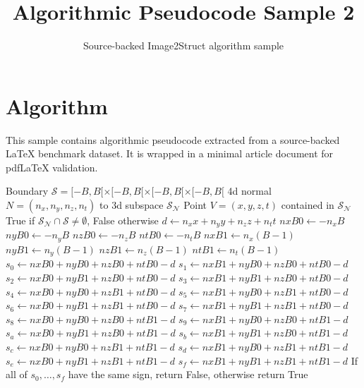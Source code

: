 \documentclass[11pt]{article}
\title{Algorithmic Pseudocode Sample 2}
\author{Source-backed Image2Struct algorithm sample}
\date{}
\begin{document}
\maketitle
\section{Algorithm}
This sample contains algorithmic pseudocode extracted from a source-backed LaTeX benchmark dataset. It is wrapped in a minimal article document for pdfLaTeX validation.

\begin{algorithm}[htbp]
\caption{Source-backed algorithmic procedure}
\begin{algorithm}
[!ht]
\caption{3d Subspace Intersects Box}
\begin{algorithmic}
\Require
\State \hspace{5mm}Boundary $\mathcal{S} = [-B,B[\times[-B,B[\times[-B,B[\times[-B,B[$
\State \hspace{5mm}4d normal $N=(n_x,n_y,n_z,n_t)$ to 3d subspace $\mathcal{S_N}$
\State \hspace{5mm}Point $V=(x,y,z,t)$ contained in $\mathcal{S_N}$
\Ensure
True if $\mathcal{S_N} \cap \mathcal{S} \neq \emptyset$, False otherwise
\vspace{1mm}
\Procedure{}{}
\vspace{1mm}
\State $d \gets n_xx + n_yy + n_zz + n_tt$
\State $nxB0 \gets -n_xB$
\State $nyB0 \gets -n_yB$
\State $nzB0 \gets -n_zB$
\State $ntB0 \gets -n_tB$
\State $nxB1 \gets n_x(B-1)$
\State $nyB1 \gets n_y(B-1)$
\State $nzB1 \gets n_z(B-1)$
\State $ntB1 \gets n_t(B-1)$
\State $s_0 \gets nxB0 + nyB0 + nzB0 + ntB0 - d$
\State $s_1 \gets nxB1 + nyB0 + nzB0 + ntB0 - d$
\State $s_2 \gets nxB0 + nyB1 + nzB0 + ntB0 - d$
\State $s_3 \gets nxB1 + nyB1 + nzB0 + ntB0 - d$
\State $s_4 \gets nxB0 + nyB0 + nzB1 + ntB0 - d$
\State $s_5 \gets nxB1 + nyB0 + nzB1 + ntB0 - d$
\State $s_6 \gets nxB0 + nyB1 + nzB1 + ntB0 - d$
\State $s_7 \gets nxB1 + nyB1 + nzB1 + ntB0 - d$
\State $s_8 \gets nxB0 + nyB0 + nzB0 + ntB1 - d$
\State $s_9 \gets nxB1 + nyB0 + nzB0 + ntB1 - d$
\State $s_a \gets nxB0 + nyB1 + nzB0 + ntB1 - d$
\State $s_b \gets nxB1 + nyB1 + nzB0 + ntB1 - d$
\State $s_c \gets nxB0 + nyB0 + nzB1 + ntB1 - d$
\State $s_d \gets nxB1 + nyB0 + nzB1 + ntB1 - d$
\State $s_e \gets nxB0 + nyB1 + nzB1 + ntB1 - d$
\State $s_f \gets nxB1 + nyB1 + nzB1 + ntB1 - d$
\State If all of $s_0,\dots,s_f$ have the same sign, return False, otherwise return True
\EndProcedure
\end{algorithmic}\end{algorithm}
\end{algorithm}
\end{document}
